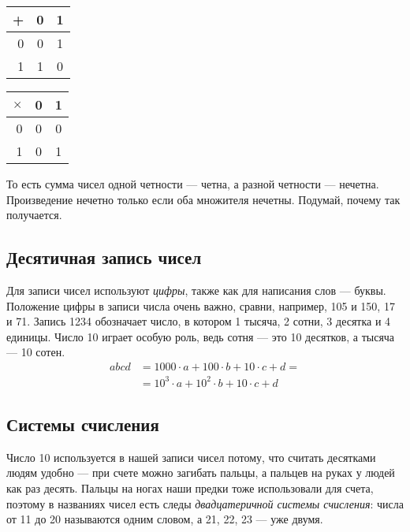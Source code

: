 \documentclass[a4paper,12pt]{article}
\begin{document}
    \vspace*{\baselineskip}
    
    \begin{tabular}{r|cc}
        + & 0 & 1 \\
        \hline
        0 & 0 & 1 \\
        1 & 1 & 0
    \end{tabular}
    \qquad
    \begin{tabular}{r|cc}
        $\times$ & 0 & 1 \\
        \hline
        0     & 0 & 0 \\
        1     & 0 & 1 \\
    \end{tabular}

    \vspace*{\baselineskip}

    То есть сумма чисел одной четности --- четна, а разной четности --- нечетна.
    Произведение нечетно только если оба множителя нечетны. Подумай, почему
    так получается.

    \subsection{Десятичная запись чисел}
    Для записи чисел используют \emph{цифры}, также как для написания слов --- буквы.
    Положение цифры в записи числа очень важно, сравни, например, 105 и 150, 17 и 71.
    Запись 1234 обозначает число, в котором 1 тысяча, 2 сотни, 3 десятка и 4 единицы.
    Число 10 играет особую роль, ведь сотня --- это 10 десятков, а тысяча --- 10 
    сотен. 
    \begin{align*}
        abcd &= 1000\cdot a + 100\cdot b + 10\cdot c +  d = \\
             &= 10^3\cdot a + 10^2\cdot b + 10\cdot c + d  
    \end{align*}

    \subsection{Системы счисления}
    Число 10 используется в нашей записи чисел потому, что считать десятками людям
    удобно --- при счете можно загибать пальцы, а пальцев на руках у людей 
    как раз десять. Пальцы на ногах наши предки тоже использовали для счета, поэтому в названиях
    чисел есть следы \emph{двадцатеричной системы счисления}: числа от 11 до 20 называются
    одним словом, а 21, 22, 23 --- уже двумя.
\end{document}
